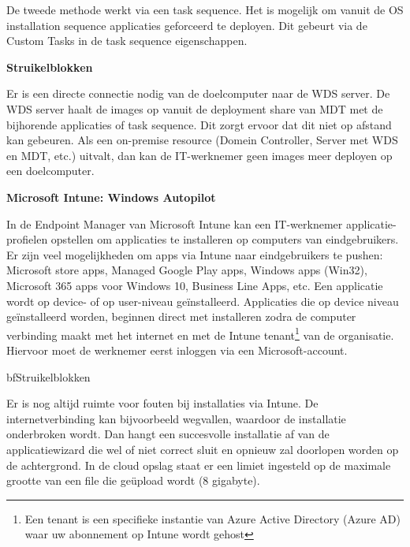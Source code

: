 
De tweede methode werkt via een task sequence. Het is mogelijk om vanuit de OS installation sequence applicaties geforceerd te deployen. Dit gebeurt via de Custom Tasks in de task sequence eigenschappen.


\textbf{Struikelblokken}

Er is een directe connectie nodig van de doelcomputer naar de WDS server. De WDS server haalt de images op vanuit de deployment share van MDT met de bijhorende applicaties of task sequence. Dit zorgt ervoor dat dit niet op afstand kan gebeuren. Als een on-premise resource (Domein Controller, Server met WDS en MDT, etc.) uitvalt, dan kan de IT-werknemer geen images meer deployen op een doelcomputer.


\textbf{Microsoft Intune: Windows Autopilot}

In de Endpoint Manager van Microsoft Intune kan een IT-werknemer applicatie-profielen opstellen om applicaties te installeren op computers van eindgebruikers. Er zijn veel mogelijkheden om apps via Intune naar eindgebruikers te pushen: Microsoft store apps, Managed Google Play apps, Windows apps (Win32), Microsoft 365 apps voor Windows 10, Business Line Apps, etc. Een applicatie wordt op device- of op user-niveau geïnstalleerd. Applicaties die op device niveau geïnstalleerd worden, beginnen direct met installeren zodra de computer verbinding maakt met het internet en met de Intune tenant\footnote{Een tenant is een specifieke instantie van Azure Active Directory (Azure AD) waar uw abonnement op Intune wordt gehost} van de organisatie. Hiervoor moet de werknemer eerst inloggen via een Microsoft-account.
\autocite{Erikre2022}

bf{Struikelblokken}

Er is nog altijd ruimte voor fouten bij installaties via Intune. De internetverbinding kan bijvoorbeeld wegvallen, waardoor de installatie onderbroken wordt. Dan hangt een succesvolle installatie af van de applicatiewizard die wel of niet correct sluit en opnieuw zal doorlopen worden op de achtergrond. In de cloud opslag staat er een limiet ingesteld op de maximale grootte van een file die geüpload wordt (8 gigabyte).\autocite{Erikre2022}



